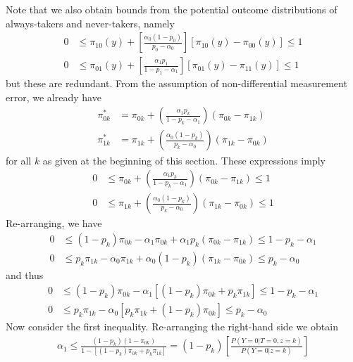 \documentclass[12pt]{article}
\begin{document}
Note that we also obtain bounds from the potential outcome distributions of always-takers and never-takers, namely 
\begin{align*}
  0 &\leq  \pi_{10}(y) + \left[\frac{\alpha_0 (1 - p_0)}{p_0 - \alpha_0}\right]\left[ \pi_{10}(y) - \pi_{00}(y) \right] \leq 1\\
  0&\leq  \pi_{01}(y) + \left[\frac{\alpha_1 p_1}{1 - p_1 - \alpha_1} \right] \left[ \pi_{01}(y) - \pi_{11}(y) \right] \leq 1
\end{align*}
but these are redundant.
From the assumption of non-differential measurement error, we already have 
\begin{align*}
  \pi_{0k}^* &= \pi_{0k} + \left( \frac{\alpha_1 p_k}{1 - p_k - \alpha_1} \right) \left( \pi_{0k} - \pi_{1k} \right) \\
  \pi_{1k}^* &= \pi_{1k} + \left( \frac{\alpha_0 (1 - p_k)}{p_k - \alpha_0} \right) \left( \pi_{1k} - \pi_{0k} \right) 
\end{align*}
for all $k$ as given at the beginning of this section.
These expressions imply
\begin{align*}
 0 &\leq \pi_{0k} + \left( \frac{\alpha_1 p_k}{1 - p_k - \alpha_1} \right) \left( \pi_{0k} - \pi_{1k} \right) \leq 1 \\
  0 &\leq \pi_{1k} + \left( \frac{\alpha_0 (1 - p_k)}{p_k - \alpha_0} \right) \left( \pi_{1k} - \pi_{0k} \right) \leq 1
\end{align*}
Re-arranging, we have
\begin{align*}
  0 &\leq (1 - p_k)\pi_{0k} - \alpha_1 \pi_{0k} + \alpha_1 p_k \left( \pi_{0k} - \pi_{1k} \right) \leq 1 - p_k - \alpha_1 \\
 0 &\leq p_k \pi_{1k}- \alpha_0\pi_{1k} + \alpha_0 (1 - p_k) \left( \pi_{1k} - \pi_{0k} \right) \leq p_k - \alpha_0
\end{align*}
and thus
\begin{align*}
  0 &\leq (1 - p_k)\pi_{0k} - \alpha_1 \left[(1 - p_k)\pi_{0k} + p_k \pi_{1k} \right] \leq 1 - p_k - \alpha_1 \\
  0 &\leq p_k \pi_{1k} - \alpha_0\left[p_k\pi_{1k} + (1 - p_k)\pi_{0k}\right] \leq p_k - \alpha_0
\end{align*}
Now consider the first inequality.
Re-arranging the right-hand side we obtain
\begin{align*}
  \alpha_1 \leq \frac{(1 - p_k)(1 - \pi_{0k})}{1 - \left[ (1 - p_k)\pi_{0k} + p_k \pi_{1k} \right]} = (1 - p_k) \left[ \frac{P(Y=0|T=0, z=k)}{P(Y=0|z=k)} \right]
\end{align*}
\end{document}
